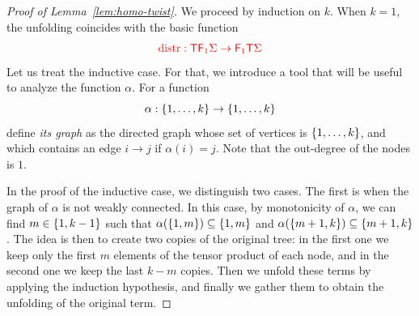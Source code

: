 \begin{proof}[Proof of Lemma~\ref{lem:homo-twist}]
We proceed by induction on $k$. When $k=1$, the unfolding coincides with the basic function 
\begin{align*}
{\color{red}{{\color{red}{\mathrm{distr}}}: {\color{red}{\mathsf T}}{\color{red}{\mathsf F_{1}}}\Sigma \to {{\color{red}{\mathsf F_{1}}}{\color{red}{\mathsf T}}\Sigma}}}
\end{align*}
Let us treat the inductive case. For that, we introduce a tool that will be useful to analyze the function $\alpha$. For a function $$\alpha: \{1,\ldots,k\} \to \{1,\ldots,k\}$$ define  \emph{its graph} as the directed graph whose set of vertices is $\{1,\ldots,k\}$, and which contains an edge $i\rightarrow j$ if $\alpha(i)=j$. Note that the out-degree of the nodes is $1.$

\medskip
In the proof of the inductive case, we distinguish two cases. The first is when the graph of $\alpha$ is not weakly connected. In this case, by monotonicity of $\alpha$, we can find $m\in \{1,k-1\}$ such that $\alpha(\{1,m\})\subseteq\{1,m\}$ and $\alpha(\{m+1,k\})\subseteq\{m+1,k\}$. The idea is then to create two copies of the original tree: in the first one we keep only the first $m$ elements of the tensor product of each node, and in the second one we keep the last $k-m$ copies. Then we unfold these terms by applying the induction hypothesis, and  finally we gather them to obtain the  unfolding of the original term. 


\end{proof}
